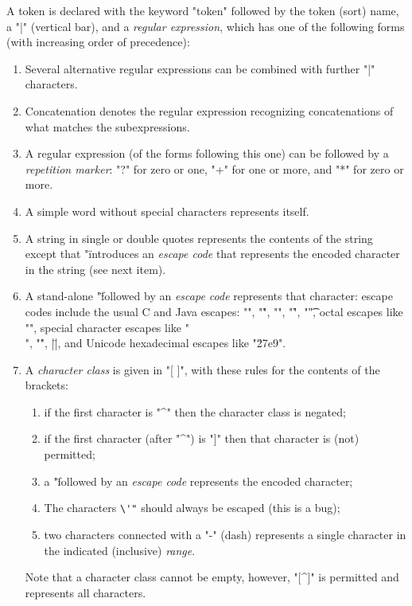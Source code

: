 \documentclass[12pt]{article} %
\begin{document}
\begin{manual}\label{man:token}
  A token is declared with the keyword "token" followed by the token (sort) name, a "|" (vertical
  bar), and a \emph{regular expression}, which has one of the following forms (with increasing order
  of precedence):
  \begin{enumerate}

  \item Several alternative regular expressions can be combined with further "|" characters.

  \item Concatenation denotes the regular expression recognizing concatenations of what matches the
    subexpressions.

  \item A regular expression (of the forms following this one) can be followed by a \emph{repetition
      marker}: "?" for zero or one, "+" for one or more, and "*" for zero or more.

  \item A simple word without special characters represents itself.

  \item A string in single or double quotes represents the contents of the string except that "\"
    introduces an \emph{escape code} that represents the encoded character in the string (see next item).

  \item A stand-alone "\" followed by an \emph{escape code} represents that character: escape codes
    include the usual C and Java escapes: "\n", "\r", "\a", "\f", "\t", octal escapes like "",
    special character escapes like "\\", "\'", \hacsc|\"|, and Unicode hexadecimal escapes like
    "\u27e9".

  \item A \emph{character class} is given in "[ ]", with these rules for the contents of the brackets:
   \begin{enumerate}
    \item if the first character is "^" then the character class is negated;
    \item if the first character (after "^") is "]" then that character is (not) permitted;
    \item a "\" followed by an \emph{escape code} represents the encoded character;
    \item The characters \verb|\'"| should always be escaped (this is a bug);
    \item two characters connected with a "-" (dash) represents a single character in the indicated
      (inclusive) \emph{range}.
    \end{enumerate}
    Note that a character class cannot be empty, however, "[^]" is permitted and represents all
    characters.


\end{enumerate}
\end{manual}
\end{document}

